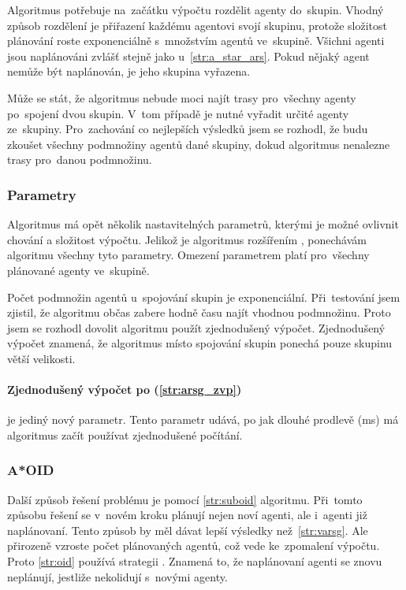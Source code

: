 Algoritmus potřebuje na~začátku výpočtu rozdělit agenty do~skupin.
Vhodný způsob rozdělení je přiřazení každému agentovi svojí skupinu,
protože složitost plánování roste exponenciálně s~množstvím agentů ve~skupině.
Všichni agenti jsou naplánováni zvlášť stejně jako u~\ref{str:a_star_ars}.
Pokud nějaký agent nemůže být naplánován, je jeho skupina vyřazena.

Může se stát, že algoritmus nebude moci najít trasy pro~všechny agenty po~spojení dvou skupin.
V~tom případě je nutné vyřadit určité agenty ze~skupiny.
Pro~zachování co nejlepších výsledků jsem se rozhodl, že budu zkoušet všechny podmnožiny agentů dané skupiny,
dokud algoritmus nenalezne trasy pro~danou podmnožinu.

\subsubsection{Parametry}\label{subsubsec:arsg_parametry}
Algoritmus má opět několik nastavitelných parametrů, kterými je možné ovlivnit chování a složitost výpočtu.
Jelikož je algoritmus rozšířením , ponechávám algoritmu všechny tyto parametry.
Omezení parametrem platí pro~všechny plánované agenty ve~skupině.

Počet podmnožin agentů u~spojování skupin je exponenciální.
Při~testování jsem zjistil, že algoritmu občas zabere hodně času najít vhodnou podmnožinu.
Proto jsem se rozhodl dovolit algoritmu použít zjednodušený výpočet.
Zjednodušený výpočet znamená, že algoritmus místo spojování skupin ponechá pouze skupinu větší velikosti.

\paragraph{Zjednodušený výpočet po (\ref{str:arsg_zvp})} je jediný nový parametr.
Tento parametr udává, po jak dlouhé prodlevě (ms) má algoritmus začít používat zjednodušené počítání.

\subsubsection{A*OID}\label{subsubsec:a_star_aoid}
Další způsob řešení  problému je pomocí \ref{str:suboid} algoritmu.
Při~tomto způsobu řešení se v~novém kroku plánují nejen noví agenti, ale i~agenti již naplánovaní.
Tento způsob by měl dávat lepší výsledky než~\ref{str:varsg}.
Ale přirozeně vzroste počet plánovaných agentů, což vede ke~zpomalení výpočtu.
Proto \ref{str:oid} používá strategii .
Znamená to, že naplánovaní agenti se znovu neplánují, jestliže nekolidují s~novými agenty.

